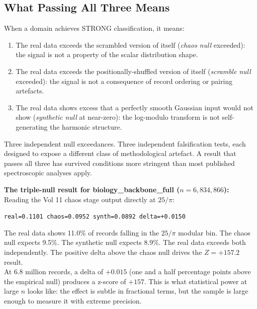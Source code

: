 \documentclass[11pt, letterpaper, openany]{book}
\begin{document}
\subsection*{What Passing All Three Means}

When a domain achieves STRONG classification, it means:

\begin{enumerate}
\item The real data exceeds the scrambled version of itself (\textit{chaos null} exceeded):
  the signal is not a property of the scalar distribution shape.

\item The real data exceeds the positionally-shuffled version of itself
  (\textit{scramble null} exceeded): the signal is not a consequence of
  record ordering or pairing artefacts.

\item The real data shows excess that a perfectly smooth Gaussian input
  would not show (\textit{synthetic null} at near-zero): the log-modulo
  transform is not self-generating the harmonic structure.
\end{enumerate}

Three independent null exceedances. Three independent falsification tests,
each designed to expose a different class of methodological artefact.
A result that passes all three has survived conditions more stringent than
most published spectroscopic analyses apply.

\begin{spectrobox}
\textbf{The triple-null result for biology\_backbone\_full ($n = 6{,}834{,}866$):}\\[0.5em]
Reading the Vol 11 chaos stage output directly at $25/\pi$:
\begin{center}
\texttt{real=0.1101 \quad chaos=0.0952 \quad synth=0.0892 \quad delta=+0.0150}
\end{center}
The real data shows 11.0\% of records falling in the $25/\pi$ modular bin.
The chaos null expects 9.5\%. The synthetic null expects 8.9\%.
The real data exceeds both independently. The positive delta above the chaos null
drives the $Z = +157.2$ result.\\[0.5em]
At 6.8 million records, a delta of $+0.015$ (one and a half percentage points
above the empirical null) produces a z-score of $+157$. This is what
statistical power at large $n$ looks like: the effect is subtle in fractional
terms, but the sample is large enough to measure it with extreme precision.
\end{spectrobox}
\end{document}
